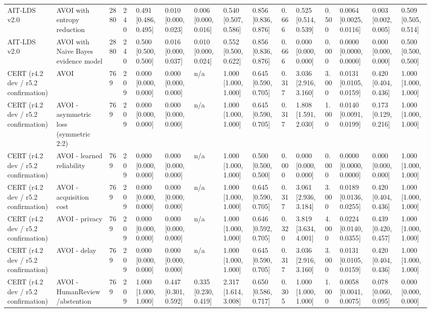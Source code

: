 \begin{table}[!ht]
{\begin{tabular}{lllllllllllllll}
AIT-LDS v2.0 & AVOI with entropy reduction & 2880 & 240 & 0.491 [0.486, 0.495] & 0.010 [0.000, 0.023] & 0.006 [0.000, 0.016] & 0.540 [0.507, 0.586] & 0.856 [0.836, 0.876] & 0.666 & 0.525 [0.514, 0.539] & 0.500 & 0.0064 [0.0025, 0.0116] & 0.003 [0.002, 0.005] & 0.509 [0.505, 0.514] \\
AIT-LDS v2.0 & AVOI with Naive Bayes evidence model & 2880 & 240 & 0.500 [0.500, 0.500] & 0.016 [0.000, 0.037] & 0.010 [0.000, 0.024] & 0.552 [0.500, 0.622] & 0.856 [0.836, 0.876] & 0.666 & 0.000 [0.000, 0.000] & 0.000 & 0.0000 [0.0000, 0.0000] & 0.000 [0.000, 0.000] & 0.500 [0.500, 0.500] \\
CERT (r4.2 dev / r5.2 confirmation) & AVOI & 769 & 209 & 0.000 [0.000, 0.000] & 0.000 [0.000, 0.000] & n/a & 1.000 [1.000, 1.000] & 0.645 [0.590, 0.705] & 0.317 & 3.036 [2.916, 3.160] & 3.000 & 0.0131 [0.0105, 0.0159] & 0.420 [0.404, 0.436] & 1.000 [1.000, 1.000] \\
CERT (r4.2 dev / r5.2 confirmation) & AVOI - asymmetric loss (symmetric 2:2) & 769 & 209 & 0.000 [0.000, 0.000] & 0.000 [0.000, 0.000] & n/a & 1.000 [1.000, 1.000] & 0.645 [0.590, 0.705] & 0.317 & 1.808 [1.591, 2.030] & 1.000 & 0.0140 [0.0091, 0.0199] & 0.173 [0.129, 0.216] & 1.000 [1.000, 1.000] \\
CERT (r4.2 dev / r5.2 confirmation) & AVOI - learned reliability & 769 & 209 & 0.000 [0.000, 0.000] & 0.000 [0.000, 0.000] & n/a & 1.000 [1.000, 1.000] & 0.500 [0.500, 0.500] & 0.000 & 0.000 [0.000, 0.000] & 0.000 & 0.0000 [0.0000, 0.0000] & 0.000 [0.000, 0.000] & 1.000 [1.000, 1.000] \\
CERT (r4.2 dev / r5.2 confirmation) & AVOI - acquisition cost & 769 & 209 & 0.000 [0.000, 0.000] & 0.000 [0.000, 0.000] & n/a & 1.000 [1.000, 1.000] & 0.645 [0.590, 0.705] & 0.317 & 3.061 [2.936, 3.184] & 3.000 & 0.0189 [0.0136, 0.0255] & 0.420 [0.404, 0.436] & 1.000 [1.000, 1.000] \\
CERT (r4.2 dev / r5.2 confirmation) & AVOI - privacy & 769 & 209 & 0.000 [0.000, 0.000] & 0.000 [0.000, 0.000] & n/a & 1.000 [1.000, 1.000] & 0.646 [0.592, 0.705] & 0.320 & 3.819 [3.634, 4.001] & 4.000 & 0.0224 [0.0140, 0.0355] & 0.439 [0.420, 0.457] & 1.000 [1.000, 1.000] \\
CERT (r4.2 dev / r5.2 confirmation) & AVOI - delay & 769 & 209 & 0.000 [0.000, 0.000] & 0.000 [0.000, 0.000] & n/a & 1.000 [1.000, 1.000] & 0.645 [0.590, 0.705] & 0.317 & 3.036 [2.916, 3.160] & 3.000 & 0.0131 [0.0105, 0.0159] & 0.420 [0.404, 0.436] & 1.000 [1.000, 1.000] \\
CERT (r4.2 dev / r5.2 confirmation) & AVOI - HumanReview/abstention & 769 & 209 & 1.000 [1.000, 1.000] & 0.447 [0.301, 0.592] & 0.335 [0.230, 0.419] & 2.317 [1.614, 3.008] & 0.650 [0.586, 0.717] & 0.305 & 1.000 [1.000, 1.000] & 1.000 & 0.0058 [0.0041, 0.0075] & 0.078 [0.060, 0.095] & 0.000 [0.000, 0.000] \\

\end{tabular}}
\end{table}
